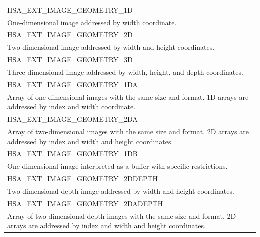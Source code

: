 \documentclass[final,oneside]{book}
\newcommand{\reftyp}[1]{#1}
\newcommand{\refenu}[1]{\reftyp{#1}}
\begin{document}
\begin{longtable}{@{\hspace{2em}}p{\linewidth-2em}}
\hspace{-2em}\refenu{HSA_\-EXT_\-IMAGE_\-GEOMETRY_\-1D}\\One-dimensional image addressed by width coordinate.\\[2mm]
\hspace{-2em}\refenu{HSA_\-EXT_\-IMAGE_\-GEOMETRY_\-2D}\\Two-dimensional image addressed by width and height coordinates.\\[2mm]
\hspace{-2em}\refenu{HSA_\-EXT_\-IMAGE_\-GEOMETRY_\-3D}\\Three-dimensional image addressed by width, height, and depth coordinates.\\[2mm]
\hspace{-2em}\refenu{HSA_\-EXT_\-IMAGE_\-GEOMETRY_\-1DA}\\Array of one-dimensional images with the same size and format. 1D arrays are addressed by index and width coordinate.\\[2mm]
\hspace{-2em}\refenu{HSA_\-EXT_\-IMAGE_\-GEOMETRY_\-2DA}\\Array of two-dimensional images with the same size and format. 2D arrays are addressed by index and width and height coordinates.\\[2mm]
\hspace{-2em}\refenu{HSA_\-EXT_\-IMAGE_\-GEOMETRY_\-1DB}\\One-dimensional image interpreted as a buffer with specific restrictions.\\[2mm]
\hspace{-2em}\refenu{HSA_\-EXT_\-IMAGE_\-GEOMETRY_\-2DDEPTH}\\Two-dimensional depth image addressed by width and height coordinates.\\[2mm]
\hspace{-2em}\refenu{HSA_\-EXT_\-IMAGE_\-GEOMETRY_\-2DADEPTH}\\Array of two-dimensional depth images with the same size and format. 2D arrays are addressed by index and width and height coordinates.
\end{longtable}
\end{document}
